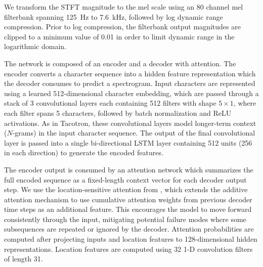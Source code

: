 %
We transform the STFT magnitude to the mel scale using an 80 channel
mel filterbank spanning 125~Hz to 7.6~kHz, followed by log dynamic
range compression.
%
Prior to log compression, the filterbank output magnitudes are clipped to a
minimum value of 0.01 in order to limit dynamic range in the logarithmic domain.

The network is composed of an encoder and a decoder with attention.
The encoder converts a character sequence into a hidden
feature representation which the decoder consumes to predict a
spectrogram.
%
Input characters are represented using a learned 512-dimensional character
embedding, which are passed through
a stack of 3 convolutional layers each containing 512 filters with shape
$5\times1$, \ie where each filter spans 5 characters, followed by batch
normalization \cite{ioffe2015batch} and ReLU activations.
%
As in Tacotron, these convolutional layers model longer-term
context (\eg $N$-grams) in the input character sequence.
%
The output of the final convolutional layer is passed into a single
bi-directional \cite{Schuster:1997:BRN:2198065.2205129} LSTM
\cite{Hochreiter:1997:LSM:1246443.1246450} layer containing 512 units
(256 in each direction) to generate the encoded features.

The encoder output is consumed by an attention network which
summarizes the full encoded sequence as a fixed-length context vector
for each decoder output step.
%
We use the location-sensitive attention from
\cite{chorowski2015attention}, which extends the additive attention
mechanism \cite{bahdanau2014neural} to use cumulative attention
weights from previous decoder time steps as an additional feature.
This encourages the model to move forward consistently through the
input, mitigating potential failure modes where some
subsequences are repeated or ignored by the decoder.
%
Attention probabilities are computed after projecting inputs %
and location features to 128-dimensional hidden representations.
Location features are computed using 32 1-D convolution filters of
length 31.

